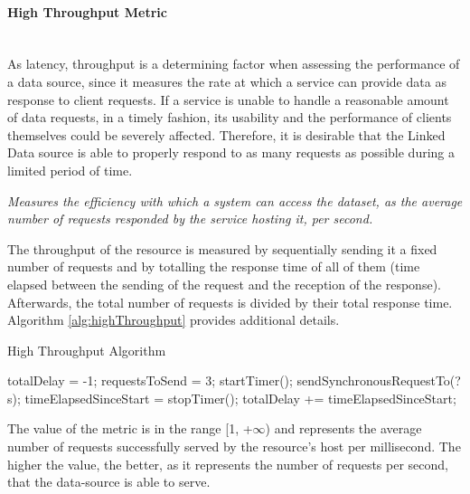 
\paragraph{High Throughput Metric} ~\\ %
As latency, throughput is a determining factor when assessing the performance of a data source, since it measures the rate at which a service can provide data as response to client requests. If a service is unable to handle a reasonable amount of data requests, in a timely fashion, its usability and the performance of clients themselves could be severely affected. Therefore, it is desirable that the Linked Data source is able to properly respond to as many requests as possible during a limited period of time.
\begin{mdframed}[style=metricdefinition]
\emph{Measures the efficiency with which a system can access the dataset, as the average number of requests responded by the service hosting it, per second.}
\end{mdframed}

The throughput of the resource is measured by sequentially sending it a fixed number of requests and by totalling the response time of all of them (time elapsed between the sending of the request and the reception of the response). Afterwards, the total number of requests is divided by their total response time. Algorithm \ref{alg:highThroughput} provides additional details.
\begin{algorithm}
\caption{High Throughput Algorithm} \label{alg:highThroughput}
\begin{algorithmic}[1]
\State totalDelay = -1;
\State requestsToSend = 3;
\EndProcedure
{}
\State startTimer();
\State sendSynchronousRequestTo(?s);
\EndFor
\State timeElapsedSinceStart = stopTimer();
\State totalDelay += timeElapsedSinceStart;
\EndIf
{}
\EndProcedure
\end{algorithmic}
\end{algorithm}
The value of the metric is in the range [1, +$\infty$) and represents the average number of requests successfully served by the resource's host per millisecond. The higher the value, the better, as it represents the number of requests per second, that the data-source is able to serve.

